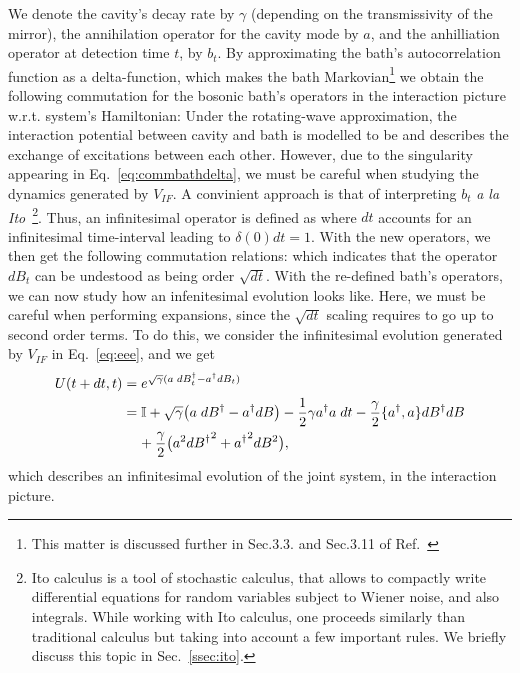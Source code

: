 We denote the cavity's decay rate by $\gamma$ (depending on the transmissivity of the mirror), the annihilation operator for the cavity mode by $a$, and the anhilliation operator at detection time $t$, by $b_t$. By approximating the bath's autocorrelation function as a delta-function, which makes the bath Markovian\footnote{This matter is discussed further in Sec.3.3. and Sec.3.11 of Ref.~\cite{wisemanbook}} we obtain the following commutation for the bosonic bath's operators in the interaction picture w.r.t. system's Hamiltonian:%
Under the rotating-wave approximation, the interaction potential between cavity and bath is modelled to be
and describes the exchange of excitations between each other. However, due to the singularity appearing in Eq.~\ref{eq:commbathdelta}, we must be careful when studying the dynamics generated by $V_{IF}$. A convinient approach is that of interpreting $b_t$ \textit{a la Ito}~\cite{wiseman1993interpretation}\footnote{Ito calculus is a tool of stochastic calculus, that allows to compactly write differential equations for random variables subject to Wiener noise, and also integrals. While working with Ito calculus, one proceeds similarly than traditional calculus but taking into account a few important rules. We briefly discuss this topic in Sec.~\ref{ssec:ito}.}. Thus, an infinitesimal operator is defined as
where $dt$ accounts for an infinitesimal time-interval leading to $\delta(0)dt = 1$. With the new operators, we then get the following commutation relations:
which indicates that the operator $dB_t$ can be undestood as being order $\sqrt{dt}$. With the re-defined bath's operators, we can now study how an infenitesimal evolution looks like. Here, we must be careful when performing expansions, since the $\sqrt{dt}$ scaling requires to go up to second order terms. To do this, we consider the infinitesimal evolution generated by $V_{IF}$ in Eq.~\ref{eq:eee}, and we get
\begin{align}
U(t+dt,t) &= e^{\sqrt{\gamma}(a \; dB_t^\dagger - a^\dagger dB_t)} \nonumber\\
&= \mathbb{I} + \sqrt{\gamma} \big( a  \; dB^\dagger - a^\dagger dB\big) - \frac{1}{2} \gamma a^\dagger a \;dt - \frac{\gamma}{2}\lbrace a^\dagger, a\rbrace dB^\dagger dB  \\ & \;\;\;\;+\frac{\gamma}{2} \big(a^2 {dB^\dagger}^2 + {a^\dagger}^2 dB^2\big) \nonumber,
\end{align}
which describes an infinitesimal evolution of the joint system, in the interaction picture.

